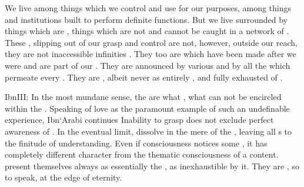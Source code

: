 %
\pa We live among things which we control and use for our purposes, among things
and institutions built to perform definite functions. But we live surrounded by
things which are , things which are not  and
cannot be caught in a network of .  These ,
slipping out of our grasp and control are not, however, outside our reach, they
are not inaccessible infinities .  They too are
 which have been made after we were  and are part of
our . They are announced by various  and by all the
 which permeate every . They are , albeit
never as entirely ,  and fully exhausted  of
.

\citet{Know that the knowable things are of two kinds. Some can be described by
  means of definitions, while others can not be defined.}{Ibn}{III:} In
the most mundane sense, the  are what ,
what can not be encircled within the \hoa.  Speaking of love as the paramount
example of such an undefinable experience, Ibn`Arabi continues  Inability to
grasp  does not exclude perfect awareness of . In the
eventual limit,  dissolve in the mere  of the
, leaving all s to the finitude of understanding.  Even if
consciousness notices some , it has completely different character
from the thematic consciousness of a  content. 
present themselves always as essentially  the , as inexhaustible by it. They are , so to
speak, at the edge of eternity.

